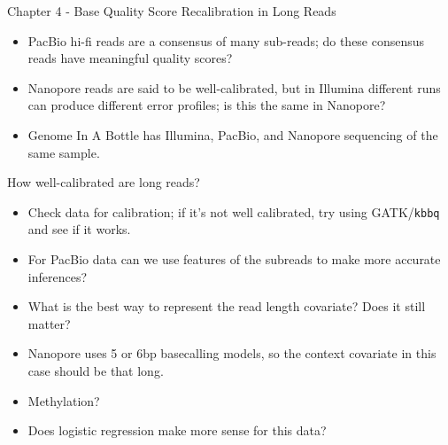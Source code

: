 \documentclass{beamer}
\begin{document}

\begin{frame}{Chapter 4 - Base Quality Score Recalibration in Long Reads}
\begin{itemize}
\item PacBio hi-fi reads are a consensus of many sub-reads; do these consensus reads have meaningful quality scores?
\item Nanopore reads are said to be well-calibrated, but in Illumina different runs can produce different error profiles; is this the same in Nanopore?
\item Genome In A Bottle has Illumina, PacBio, and Nanopore sequencing of the same sample.
\end{itemize}
\end{frame}

\begin{frame}{How well-calibrated are long reads?}
\begin{itemize}
\item Check data for calibration; if it's not well calibrated, try using GATK/\texttt{kbbq} and see if it works.
\item For PacBio data can we use features of the subreads to make more accurate inferences?
\item What is the best way to represent the read length covariate? Does it still matter?
\item Nanopore uses 5 or 6bp basecalling models, so the context covariate in this case should be that long.
\item Methylation?
\item Does logistic regression make more sense for this data?
\end{itemize}
\end{frame}
\end{document}
